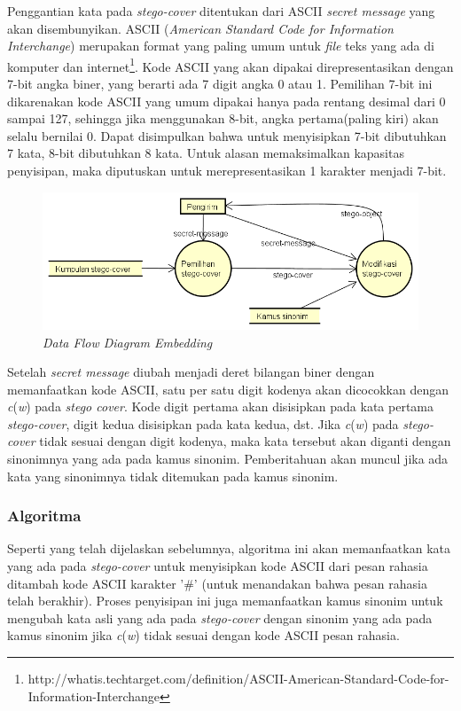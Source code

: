 Penggantian kata pada \textit{stego-cover} ditentukan dari ASCII \textit{secret message} yang akan disembunyikan. ASCII (\textit{American Standard Code for Information Interchange}) merupakan format yang paling umum untuk \textit{file} teks yang ada di komputer dan internet\footnote{http://whatis.techtarget.com/definition/ASCII-American-Standard-Code-for-Information-Interchange}. Kode ASCII yang akan dipakai direpresentasikan dengan 7-bit angka biner, yang berarti ada 7 digit angka 0 atau 1. Pemilihan 7-bit ini dikarenakan kode ASCII yang umum dipakai hanya pada rentang desimal dari 0 sampai 127, sehingga jika menggunakan 8-bit, angka pertama(paling kiri) akan selalu bernilai 0. Dapat disimpulkan bahwa untuk menyisipkan 7-bit dibutuhkan 7 kata, 8-bit dibutuhkan 8 kata.  Untuk alasan memaksimalkan kapasitas penyisipan, maka diputuskan untuk merepresentasikan 1 karakter menjadi 7-bit.

\begin{figure}[H]
	\centering
	\includegraphics[scale=0.8]{Gambar/dfd-embed}
	\caption{\textit{Data Flow Diagram Embedding}} 
	\label{fig:4-dfd-embed}
\end{figure}

Setelah \textit{secret message} diubah menjadi deret bilangan biner dengan memanfaatkan kode ASCII, satu per satu digit kodenya akan dicocokkan dengan \textit{c}(\textit{w}) pada \textit{stego cover}. Kode digit pertama akan disisipkan pada kata pertama \textit{stego-cover}, digit kedua disisipkan pada kata kedua, dst. Jika \textit{c}(\textit{w}) pada \textit{stego-cover} tidak sesuai dengan digit kodenya, maka kata tersebut akan diganti dengan sinonimnya yang ada pada kamus sinonim. Pemberitahuan akan muncul jika ada kata yang sinonimnya tidak ditemukan pada kamus sinonim.

\subsubsection{Algoritma}
\label{algoritma}
Seperti yang telah dijelaskan sebelumnya, algoritma ini akan memanfaatkan kata yang ada pada \textit{stego-cover} untuk menyisipkan kode ASCII dari pesan rahasia ditambah kode ASCII karakter '\#' (untuk menandakan bahwa pesan rahasia telah berakhir). Proses penyisipan ini juga memanfaatkan kamus sinonim untuk mengubah kata asli yang ada pada \textit{stego-cover} dengan sinonim yang ada pada kamus sinonim jika \textit{c}(\textit{w}) tidak sesuai dengan kode ASCII pesan rahasia.

